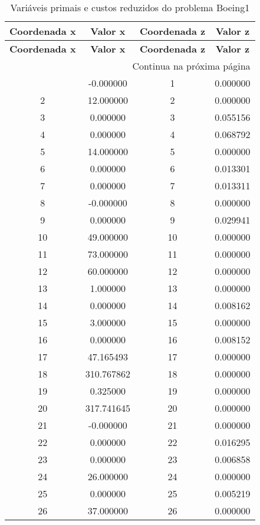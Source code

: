 \documentclass[12pt]{article}
\begin{document}
\begin{longtable}{@{}cccc@{}}
\caption{Variáveis primais e custos reduzidos do problema Boeing1} \\
\toprule
\textbf{Coordenada x} & \textbf{Valor x} & \textbf{Coordenada z} & \textbf{Valor z} \\
\midrule
\endfirsthead

\toprule
\textbf{Coordenada x} & \textbf{Valor x} & \textbf{Coordenada z} & \textbf{Valor z} \\
\midrule
\endhead

\midrule \multicolumn{4}{r}{{Continua na próxima página}} \\ \midrule
\endfoot

\bottomrule
\endlastfoot
1 & -0.000000 & 1 & 0.000000 \\
2 & 12.000000 & 2 & 0.000000 \\
3 & 0.000000 & 3 & 0.055156 \\
4 & 0.000000 & 4 & 0.068792 \\
5 & 14.000000 & 5 & 0.000000 \\
6 & 0.000000 & 6 & 0.013301 \\
7 & 0.000000 & 7 & 0.013311 \\
8 & -0.000000 & 8 & 0.000000 \\
9 & 0.000000 & 9 & 0.029941 \\
10 & 49.000000 & 10 & 0.000000 \\
11 & 73.000000 & 11 & 0.000000 \\
12 & 60.000000 & 12 & 0.000000 \\
13 & 1.000000 & 13 & 0.000000 \\
14 & 0.000000 & 14 & 0.008162 \\
15 & 3.000000 & 15 & 0.000000 \\
16 & 0.000000 & 16 & 0.008152 \\
17 & 47.165493 & 17 & 0.000000 \\
18 & 310.767862 & 18 & 0.000000 \\
19 & 0.325000 & 19 & 0.000000 \\
20 & 317.741645 & 20 & 0.000000 \\
21 & -0.000000 & 21 & 0.000000 \\
22 & 0.000000 & 22 & 0.016295 \\
23 & 0.000000 & 23 & 0.006858 \\
24 & 26.000000 & 24 & 0.000000 \\
25 & 0.000000 & 25 & 0.005219 \\
26 & 37.000000 & 26 & 0.000000 \\

\end{longtable}
\end{document}
